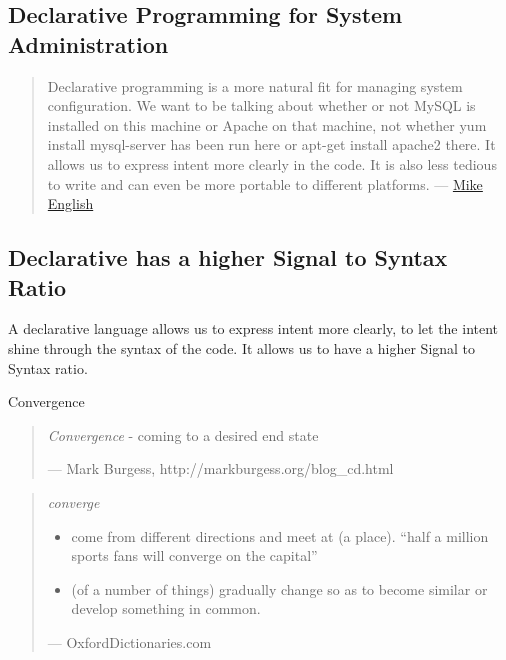 \subsection{Declarative Programming for System Administration}

\begin{quote}
Declarative programming is a more natural fit for managing system
configuration. We want to be talking about whether or not MySQL is
installed on this machine or Apache on that machine, not whether yum
install mysql-server has been run here or apt-get install apache2
there. It allows us to express intent more clearly in the code. It is
also less tedious to write and can even be more portable to different
platforms.
--- \href{http://spin.atomicobject.com/2012/09/13/from-imperative-to-declarative-system-configuration-with-puppet/}{Mike English}
\end{quote}





\subsection{Declarative has a higher Signal to Syntax Ratio}

A declarative language allows us to express intent more clearly, to let
the intent shine through the syntax of the code.  It allows us to have
a higher Signal to Syntax ratio.





Convergence

\begin{quotation}
\emph{Convergence}
- coming to a desired end state

--- Mark Burgess, http://markburgess.org/blog\_cd.html
\end{quotation}


\begin{quotation}
\emph{converge}

\begin{itemize}
\item{} come from different directions and meet at (a place).
``half a million sports fans will converge on the capital''
\item{} (of a number of things) gradually change so as to become similar or develop something in common.
\end{itemize}

--- OxfordDictionaries.com
\end{quotation}





